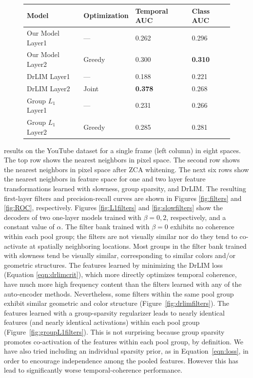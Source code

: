 \begin{figure} \centering \begin{tabular}{| l | l | l | l |} \hline Model &
Optimization & Temporal AUC & Class AUC \\ \hline Our Model Layer1 & --- &
0.262 & 0.296 \\ Our Model Layer2 & Greedy & 0.300 & \bf{0.310} \\ DrLIM Layer1
& --- & 0.188 & 0.221 \\ DrLIM Layer2 & Joint & \bf{0.378} & 0.268 \\ Group
$L_1$ Layer1 & --- & 0.231 & 0.266 \\ Group $L_1$ Layer2 & Greedy & 0.285 &
0.281 \\ \hline \end{tabular} \end{figure} %
results on the YouTube dataset for a single frame (left column) in eight
spaces. The top row shows the nearest neighbors in pixel space. The second row
shows the nearest neighbors in pixel space after ZCA whitening. The next six
rows show the nearest neighbors in feature space for one and two layer feature
transformations learned with slowness, group sparsity, and DrLIM. The resulting
first-layer filters and precision-recall curves are shown in Figures
\ref{fig:filters} and \ref{fig:ROC}, respectively.   Figures
\ref{fig:L1filters} and \ref{fig:slowfilters} show the decoders of two
one-layer models trained with $\beta = 0,2$, respectively, and a constant value
of $\alpha$. The filter bank trained with $\beta = 0$ exhibits no coherence
within each pool group; the filters are not visually similar nor do they tend
to co-activate at spatially neighboring locations. Most groups in the filter
bank trained with slowness tend be visually similar, corresponding to similar
colors and/or geometric structures. The features learned by minimizing the
DrLIM loss (Equation \ref{eqn:drlimcrit}), which more directly optimizes
temporal coherence, have much more high frequency content than the filters
learned with any of the auto-encoder methods. Nevertheless, some filters within
the same pool group exhibit similar geometric and color structure
(Figure~\ref{fig:drlimfilters}). The features learned with a group-sparsity
regularizer leads to nearly identical features (and nearly identical
activations) within each pool group (Figure~\ref{fig:groupL1filters}). This is
not surprising because group sparsity promotes co-activation of the features
within each pool group, by definition. We have also tried including an
individual sparsity prior, as in Equation~\ref{eqn:loss}, in order to encourage
independence among the pooled features. However this has lead to significantly
worse temporal-coherence performance.  %

